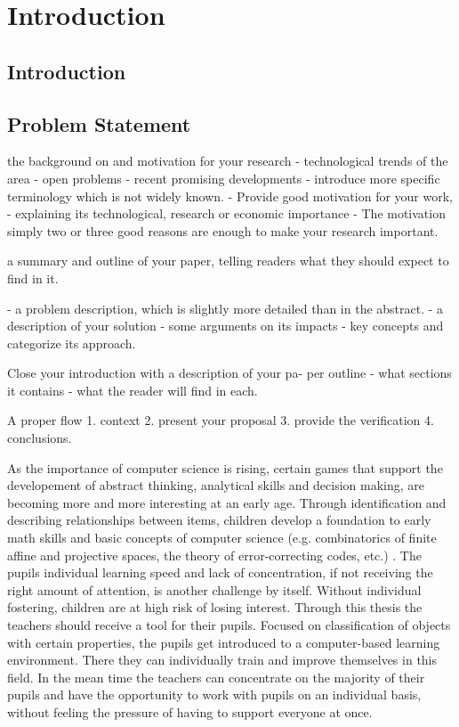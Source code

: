 
\setcounter{chapter}{0}

\chapter{Introduction}
\label{chap:introduction}

\section{Introduction}
\section{Problem Statement}


the background on and motivation for your research
- technological trends of the area
- open problems
- recent promising developments
- introduce more specific terminology which is not widely known.
- Provide good motivation for your work,
- explaining its technological, research or economic importance
- The motivation simply two or three good reasons are enough to
make your research important.

a summary and outline of your paper, telling readers what they should expect to find in it.

- a problem description, which is slightly more detailed than in the abstract.
- a description of your solution
- some arguments on its impacts
- key concepts and categorize its approach.

Close your introduction with a description of your pa-
per outline
- what sections it contains
- what the reader will find in each.

A proper flow
1. context
2. present your proposal
3. provide the verification
4. conclusions.

As the importance of computer science is rising, certain games that support the
developement of abstract thinking, analytical skills and decision making, are
becoming more and more interesting at an early age. Through identification and
describing relationships between items, children develop a foundation to early
math skills and basic concepts of computer science (e.g. combinatorics of finite
affine and projective spaces, the theory of error-correcting codes, etc.)
. The pupils individual learning speed and lack of concentration, if
not receiving the right amount of attention, is another challenge by itself.
Without individual fostering, children are at high risk of losing interest.
Through this thesis the teachers should receive a tool for their pupils. Focused
on classification of objects with certain properties, the pupils get introduced
to a computer-based learning environment. There they can individually train and
improve themselves in this field. In the mean time the teachers can concentrate
on the majority of their pupils and have the opportunity to work with pupils on
an individual basis, without feeling the pressure of having to support everyone
at once.

